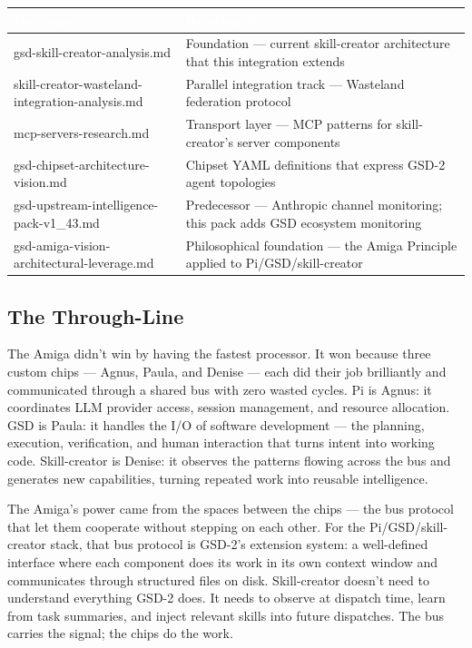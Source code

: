 \documentclass[11pt,letterpaper]{article}
\newcommand{\tableheader}[1]{\textbf{\sffamily\textcolor{white}{#1}}}
\begin{document}
\begin{center}
\begin{tabularx}{\textwidth}{L{4.5cm}X}
\toprule
{}
\tableheader{Document} & \tableheader{Relationship} \\
\midrule
gsd-skill-creator-analysis.md & Foundation --- current skill-creator architecture that this integration extends \\
skill-creator-wasteland-integration-analysis.md & Parallel integration track --- Wasteland federation protocol \\
mcp-servers-research.md & Transport layer --- MCP patterns for skill-creator's server components \\
gsd-chipset-architecture-vision.md & Chipset YAML definitions that express GSD-2 agent topologies \\
gsd-upstream-intelligence-pack-v1\_43.md & Predecessor --- Anthropic channel monitoring; this pack adds GSD ecosystem monitoring \\
gsd-amiga-vision-architectural-leverage.md & Philosophical foundation --- the Amiga Principle applied to Pi/GSD/skill-creator \\
\bottomrule
\end{tabularx}
\end{center}

\subsection{The Through-Line}

The Amiga didn't win by having the fastest processor. It won because three custom chips --- Agnus, Paula, and Denise --- each did their job brilliantly and communicated through a shared bus with zero wasted cycles. Pi is Agnus: it coordinates LLM provider access, session management, and resource allocation. GSD is Paula: it handles the I/O of software development --- the planning, execution, verification, and human interaction that turns intent into working code. Skill-creator is Denise: it observes the patterns flowing across the bus and generates new capabilities, turning repeated work into reusable intelligence.

The Amiga's power came from the spaces between the chips --- the bus protocol that let them cooperate without stepping on each other. For the Pi/GSD/skill-creator stack, that bus protocol is GSD-2's extension system: a well-defined interface where each component does its work in its own context window and communicates through structured files on disk. Skill-creator doesn't need to understand everything GSD-2 does. It needs to observe at dispatch time, learn from task summaries, and inject relevant skills into future dispatches. The bus carries the signal; the chips do the work.
\end{document}
